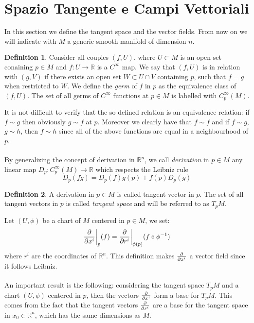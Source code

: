\documentclass[12pt,a4paper]{report}
\theoremstyle{definition}
\newtheorem{Def}{Definition}[chapter]
\theoremstyle{Theorem}
\theoremstyle{definition}
\theoremstyle{definition}
\begin{document}
		\section{Spazio Tangente e Campi Vettoriali}
		In this section we define the tangent space and the vector fields. From now on we will indicate with $M$ a generic smooth manifold of dimension $n$. 
		\begin{Def}
			Consider all couples $(f,U)$, where $U\subset M$ is an open set conaining $p\in M$ and $f:U\rightarrow \mathbb{R}$ is a $C^\infty$ map. We say that $(f,U)$ is in relation with $(g,V)$ if there exists an open set $W\subset U\cap V$ containing $p$, such that $f=g$ when restricted to $W$. We define the \textit{germ} of $f$ in $p$ as the equivalence class of $(f,U)$.
			The set of all germs of $C^\infty$ functions at $p\in M$ is labelled with $C^\infty_p(M)$.
		\end{Def}
		It is not difficult to verify that the so defined relation is an equivalence relation: if $f\sim g$ then obviously $g\sim f$ at $p$. Moreover we clearly have that $f\sim f$ and if $f\sim g$, $g\sim h$, then $f\sim h$ since all of the above functions are equal in a neighbourhood of $p$.\\
		\\
		By generalizing the concept of derivation in $\mathbb{R}^n$, we call \textit{derivation} in $p\in M$ any linear map $D_p:C^\infty_p(M)\rightarrow\mathbb{R}$ which respects the Leibniz rule 
		$$D_p(fg)=D_p(f)g(p)+f(p)D_p(g)$$
		\begin{Def}
			A derivation in $p\in M$ is called tangent vector in $p$. The set of all tangent vectors in $p$ is called \textit{tangent space} and will be referred to as $T_pM$.
		\end{Def} 
		Let $(U,\phi)$ be a chart of $M$ centered in $p\in M$, we set:
		$${\partial\over \partial x^i}\bigg\rvert_p(f)={\partial\over \partial r^i}\bigg\rvert_{\phi(p)}(f\circ \phi^{-1})$$ where $r^i$ are the coordinates of $\mathbb{R}^n$. This definition makes ${\partial\over \partial x^i}$ a vector field since it follows Leibniz.\\
		\\
		An important result is the following: considering the tangent space $T_pM$ and a chart $(U,\phi)$ centered in $p$, then the vectors $\partial\over \partial x^i$ form a base for $T_pM$. This comes from the fact that the tangent vectors $\partial\over \partial r^i$ are a base for the tangent space in $x_0\in\mathbb{R}^n$, which has the same dimensions as $M$.\\
\end{document}
